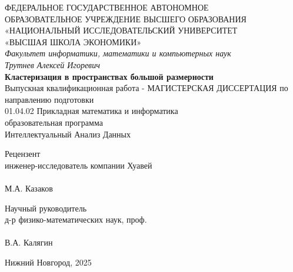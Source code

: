 \begin{titlepage}

    \begin{center}
        ФЕДЕРАЛЬНОЕ  ГОСУДАРСТВЕННОЕ АВТОНОМНОЕ \\
        ОБРАЗОВАТЕЛЬНОЕ УЧРЕЖДЕНИЕ ВЫСШЕГО ОБРАЗОВАНИЯ
        «НАЦИОНАЛЬНЫЙ ИССЛЕДОВАТЕЛЬСКИЙ УНИВЕРСИТЕТ \\
        «ВЫСШАЯ ШКОЛА ЭКОНОМИКИ»
        \\
        \textit{Факультет информатики, математики и компьютерных наук}
        \\
        \vspace{10mm}
        \textit{Трутнев Алексей Игоревич}
        \\
        \vspace{10mm}
        \textbf{Кластеризация в пространствах большой размерности}
        \\
        \vspace{10mm}
        Выпускная квалификационная работа - МАГИСТЕРСКАЯ ДИССЕРТАЦИЯ по направлению подготовки \\
        01.04.02 Прикладная математика и информатика \\
        образовательная программа \\
        Интеллектуальный Анализ Данных
    \end{center}

    \vspace{50mm}

    \hfill
    \begin{minipage}{0.4\textwidth}
        \begin{flushleft}
            Рецензент \\
            инженер-исследователь компании Хуавей \\
            \signatureline[6cm]{}
            \\
            М.А. Казаков
        \end{flushleft}
    \end{minipage}
    \hfill
    \begin{minipage}{0.4\textwidth}
        \begin{flushright}
            Научный руководитель \\
            д-р физико-математических наук, проф. \\
            \signatureline[6cm]{}
            \\
            В.А. Калягин
        \end{flushright}
    \end{minipage}

    \begin{center}
        \vspace*{\fill}
        Нижний Новгород, 2025
    \end{center}

\end{titlepage}